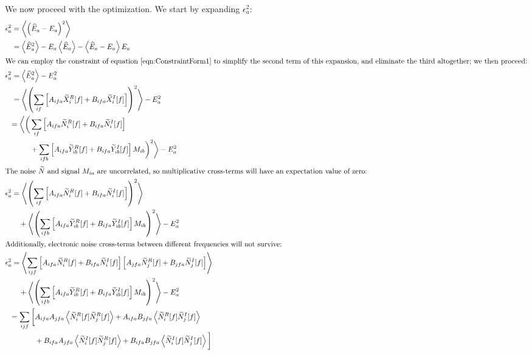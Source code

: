 We now proceed with the optimization.  We start by expanding $\epsilon^2_a$:
\begin{align*}
\epsilon^2_a &= \left< \left(\widehat{E}_a - E_a\right)^2\right> \\
%
&= \left< \widehat{E}^2_a \right> - E_a \left<\widehat{E}_a\right> - \left< \widehat{E}_a - E_a \right> E_a \\
%
\intertext{We can employ the constraint of equation~\ref{eqn:ConstraintForm1} to simplify the second term of this expansion, and eliminate the third altogether; we then proceed:}
%
\epsilon^2_a &= \left< \widehat{E}^2_a \right> - E^2_a \\
%
&= \left< \left(\sum_{if}\left[ A_{ifa} \widetilde{X}_i^R[f] + B_{ifa} \widetilde{X}_i^I[f]\right]\right)^2\right> - E^2_a \\
%
& \begin{aligned}= \bigg< \bigg(&
  \sum_{if} \left[ A_{ifa} \widetilde{N}_i^R[f] + B_{ifa} \widetilde{N}_i^I[f]\right] \\
  & + \sum_{ifb} \left[ A_{ifa} \widetilde{Y}_{ib}^R[f] + B_{ifa} \widetilde{Y}_{ib}^I[f]\right]M_{ib}  \bigg)^2 \bigg> - E^2_a
\end{aligned} \\
%
\intertext{The noise $\widetilde{N}$ and signal $M_{ia}$ are uncorrelated, so multiplicative cross-terms will have an expectation value of zero:}
%
\epsilon^2_a &= \left< \left(\sum_{if} \left[ A_{ifa} \widetilde{N}_i^R[f] + B_{ifa} \widetilde{N}_i^I[f]\right]\right)^2\right> \\
&\quad + \left<\left(\sum_{ifb} \left[ A_{ifa} \widetilde{Y}_{ib}^R[f] + B_{ifa} \widetilde{Y}_{ib}^I[f]\right]M_{ib} \right)^2 \right> - E^2_a \\
%
\intertext{Additionally, electronic noise cross-terms between different frequencies will not survive:}
%
\epsilon^2_a &= \left< \sum_{ijf} \left[ A_{ifa} \widetilde{N}_i^R[f] + B_{ifa} \widetilde{N}_i^I[f]\right] \left[ A_{jfa} \widetilde{N}_j^R[f] + B_{jfa} \widetilde{N}_j^I[f]\right] \right> \\
&\quad + \left<\left(\sum_{ifb} \left[ A_{ifa} \widetilde{Y}_{ib}^R[f] + B_{ifa} \widetilde{Y}_{ib}^I[f]\right]M_{ib} \right)^2 \right> - E^2_a \\
%
& \begin{aligned}
  = \sum_{ijf} \bigg[ & A_{ifa}A_{jfa} \left<\widetilde{N}_i^R[f]\widetilde{N}_j^R[f]\right> + A_{ifa}B_{jfa} \left<\widetilde{N}_i^R[f]\widetilde{N}_j^I[f]\right> \\
  & + B_{ifa}A_{jfa} \left<\widetilde{N}_i^I[f]\widetilde{N}_j^R[f]\right> + B_{ifa}B_{jfa} \left<\widetilde{N}_i^I[f]\widetilde{N}_j^I[f]\right>\bigg] \end{aligned} \\

\end{align*}
